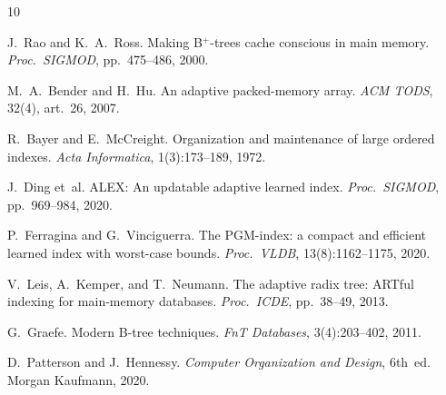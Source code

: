 \documentclass[10pt,twocolumn,letterpaper]{article}
\theoremstyle{definition}
\begin{document}
\begin{thebibliography}{10}
\small

J.~Rao and K.~A.~Ross.
Making B$^+$-trees cache conscious in main memory.
\textit{Proc.~SIGMOD}, pp.~475--486, 2000.

M.~A.~Bender and H.~Hu.
An adaptive packed-memory array.
\textit{ACM TODS}, 32(4), art.~26, 2007.

R.~Bayer and E.~McCreight.
Organization and maintenance of large ordered indexes.
\textit{Acta Informatica}, 1(3):173--189, 1972.

J.~Ding et~al.
ALEX: An updatable adaptive learned index.
\textit{Proc.~SIGMOD}, pp.~969--984, 2020.

P.~Ferragina and G.~Vinciguerra.
The PGM-index: a compact and efficient learned index with worst-case bounds.
\textit{Proc.~VLDB}, 13(8):1162--1175, 2020.

V.~Leis, A.~Kemper, and T.~Neumann.
The adaptive radix tree: ARTful indexing for main-memory databases.
\textit{Proc.~ICDE}, pp.~38--49, 2013.

G.~Graefe.
Modern B-tree techniques.
\textit{FnT Databases}, 3(4):203--402, 2011.

D.~Patterson and J.~Hennessy.
\textit{Computer Organization and Design}, 6th~ed.
Morgan Kaufmann, 2020.

\end{thebibliography}
\end{document}
